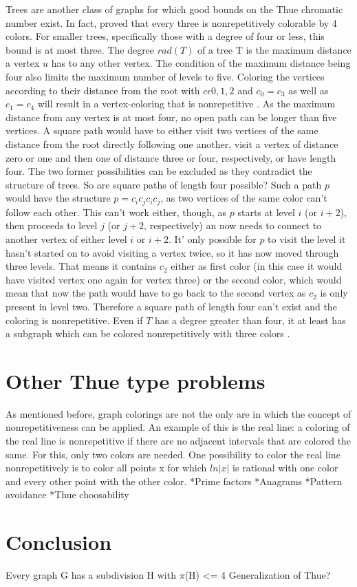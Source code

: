 \documentclass[12pt,a4paper]{article}
\begin{document}
Trees are another class of graphs for which good bounds on the Thue chromatic number exist. In fact, \citep{Bresar2007} proved that every three is nonrepetitively colorable by 4 colors. For smaller trees, specifically those with a degree of four or less, this bound is at most three. The degree $rad(T)$ of a tree T is the maximum distance a vertex $u$ has to any other vertex. The condition of the maximum distance being four also limits the maximum number of levels to five. Coloring the vertices according to their distance from the root with $c \epsilon {0, 1, 2}$ and $c_0 = c_3$ as well as $c_1 = c_4$ will result in a vertex-coloring that is nonrepetitive \citep{Bresar2007}. As the maximum distance from any vertex is at most four, no open path can be longer than five vertices. A square path would have to either visit two vertices of the same distance from the root directly following one another, visit a vertex of distance zero or one and then one of distance three or four, respectively, or have length four. The two former possibilities can be excluded as they contradict the structure of trees. So are square paths of length four possible? Such a path $p$ would have the structure $p=c_ic_jc_ic_j$, as two vertices of the same color can't follow each other. This can't work either, though, as $p$ starts at level $i$ (or $i+2$), then proceeds to level $j$ (or $j+2$, respectively) an now needs to connect to another vertex of either level $i$ or $i+2$. It' only possible for $p$ to visit the level it hasn't started on to avoid visiting a vertex twice, so it has now moved through three levels. That means it contains $c_2$ either as first color (in this case it would have visited vertex one again for vertex three) or the second color, which would mean that now the path would have to go back to the second vertex as $c_2$ is only present in level two. Therefore a square path of length four can't exist and the coloring is nonrepetitive.
\newline
Even if $T$ has a degree greater than four, it at least has a subgraph which can be colored nonrepetitively with three colors \citep{Bresar2007}.

\newpage
\section{Other Thue type problems}
As mentioned before, graph colorings are not the only are in which the concept of nonrepetitiveness can be applied. An example of this is the real line: a coloring of the real line is nonrepetitive if there are no adjacent intervals that are colored the same. For this, only two colors are needed. One possibility to color the real line nonrepetitively is to color all points x for which $ln|x|$ is rational with one color and every other point with the other color\citep{Grytczuk2008}. 
\newline
*Prime factors
\newline
*Anagrams
\newline
*Pattern avoidance
\newline
*Thue choosability

\newpage
\section{Conclusion}

Every graph G has a subdivision H with $\pi$(H) <= 4 \citep{Barat2008}
Generalization of Thue?


\newpage
\printbibliography
\end{document}
